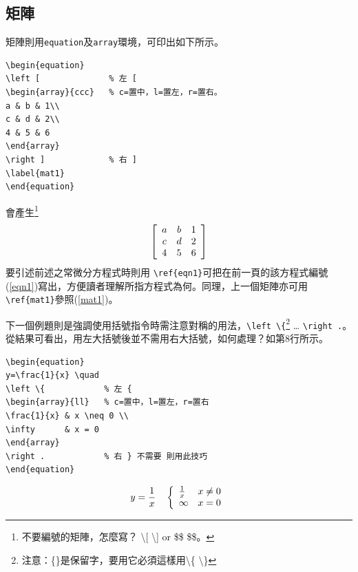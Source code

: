 \subsection{矩陣}
矩陣則用{\tt equation}及{\tt array}環境，可印出如下所示。
\begin{Verbatim}[frame=single,firstline=1,label=Every matrix]
\begin{equation}
\left [              % 左 [
\begin{array}{ccc}   % c=置中，l=置左，r=置右。
a & b & 1\\
c & d & 2\\
4 & 5 & 6
\end{array}
\right ]             % 右 ]
\label{mat1}
\end{equation}
\end{Verbatim}
會產生\footnote{不要編號的矩陣，怎麼寫？  \textbackslash [ \textbackslash ] or \$\$ \$\$。} 
\begin{equation}
\left [
\begin{array}{ccc}  \index{\LaTeX{}環境!array}
a & b & 1\\
c & d & 2\\
4 & 5 & 6
\end{array}
\right ]
\label{mat1} \index{\LaTeX!\textbackslash label}\index{\LaTeX!\textbackslash ref}
\end{equation}
要引述前述之常微分方程式時則用 \verb|\ref{eqn1}|可把在前一頁的該方程式編號(\ref{eqn1})寫出，方便讀者理解所指方程式為何。同理，上一個矩陣亦可用\verb|\ref{mat1}|參照(\ref{mat1})。

下一個例題則是強調使用括號指令時需注意對稱的用法，\verb|\left \{|\footnote{注意：\{\}是保留字，要用它必須這樣用\textbackslash \{ \textbackslash \}} \ldots
\verb|\right .|。從結果可看出，用左大括號後並不需用右大括號，如何處理？如第8行所示。

\begin{Verbatim}[frame=single,firstline=1,label=Pairs]
\begin{equation}
y=\frac{1}{x} \quad  
\left \{            % 左 {
\begin{array}{ll}   % c=置中，l=置左，r=置右
\frac{1}{x} & x \neq 0 \\  
\infty      & x = 0
\end{array}
\right .            % 右 } 不需要 則用此技巧
\end{equation}
\end{Verbatim}
\begin{equation}
y=\frac{1}{x} \quad  \index{\LaTeX!\textbackslash quad}
\left \{
\begin{array}{ll}   
\frac{1}{x} & x \neq 0 \\
\infty      & x = 0  \index{\LaTeX!\textbackslash neq}
\end{array}
\right .            
\end{equation}
